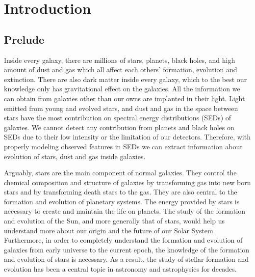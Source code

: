 \chapter{Introduction}
\label{chap:intro}

\section{Prelude}
\label{sec: overview}
Inside every galaxy, there are millions of stars, planets, black holes, and high amount of dust and gas which all affect each others' formation, evolution and extinction.
There are also dark matter inside every galaxy, which to the best our knowledge only has gravitational effect on the galaxies.%
All the information we can obtain from galaxies other than our owns are implanted in their light. %
Light emitted from young and evolved stars, and dust and gas in the space between stars have the most contribution on spectral energy distributions (SEDs) of galaxies.
We cannot detect any contribution from planets and black holes on SEDs due to their low intensity or the limitation of our detectors.
Therefore, with properly modeling observed features in SEDs we can extract information about evolution of stars, dust and gas inside galaxies.

Arguably, stars are the main component of normal galaxies.
They control the chemical composition and structure of galaxies by transforming gas into new born stars and by transforming death stars to the gas.
They are also central to the formation and evolution of planetary systems.
The energy provided by stars is necessary to create and maintain the life on planets. 
The study of the formation and evolution of the Sun, and more generally that of stars, would help us understand more about our origin and the future of our Solar System.
Furthermore, in order to completely understand the formation and evolution of galaxies from early universe to the current epoch, the knowledge of the formation and evolution of stars is necessary. 
As a result, the study of stellar formation and evolution has been a central topic in astronomy and astrophysics for decades.

